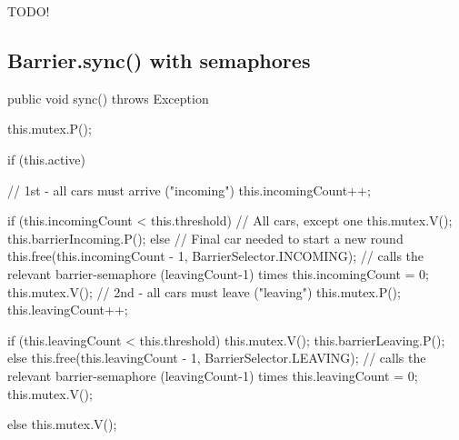 
TODO!

\subsection{Barrier.sync() with semaphores}
\label{sub:app-barr-sync}
\begin{java}
public void sync() throws Exception {
	this.mutex.P();

	if (this.active) {
		// 1st - all cars must arrive ("incoming")
		this.incomingCount++;

		if (this.incomingCount < this.threshold) { // All cars, except one
			this.mutex.V();
			this.barrierIncoming.P();
		} else { // Final car needed to start a new round
			this.free(this.incomingCount - 1, BarrierSelector.INCOMING); // calls the relevant barrier-semaphore (leavingCount-1) times
			this.incomingCount = 0;
			this.mutex.V();
		}
		// 2nd - all cars must leave ("leaving")
		this.mutex.P();
		this.leavingCount++;

		if (this.leavingCount < this.threshold) {
			this.mutex.V();
			this.barrierLeaving.P();
		} else {
			this.free(this.leavingCount - 1, BarrierSelector.LEAVING); // calls the relevant barrier-semaphore (leavingCount-1) times
			this.leavingCount = 0;
			this.mutex.V();
		}

	} else {
		this.mutex.V();
	}
}
\end{java}